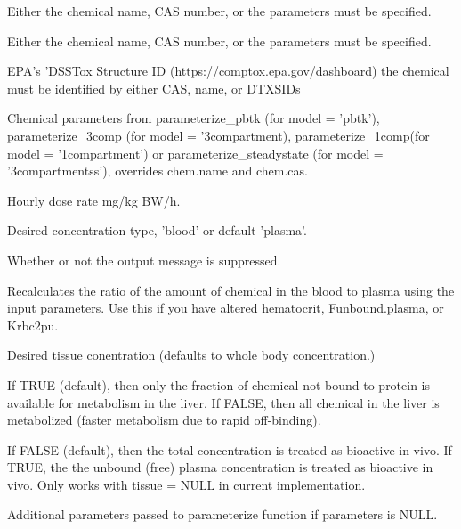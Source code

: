 \documentclass[a4paper]{book}
\begin{document}
%
\begin{Arguments}
\begin{ldescription}
\item[\code{chem.name}] Either the chemical name, CAS number, or the parameters must 
be specified.

\item[\code{chem.cas}] Either the chemical name, CAS number, or the parameters must 
be specified.

\item[\code{dtxsid}] EPA's 'DSSTox Structure ID (\url{https://comptox.epa.gov/dashboard})
the chemical must be identified by either CAS, name, or DTXSIDs

\item[\code{parameters}] Chemical parameters from parameterize\_pbtk (for model = 
'pbtk'), parameterize\_3comp (for model = '3compartment), 
parameterize\_1comp(for model = '1compartment') or parameterize\_steadystate 
(for model = '3compartmentss'), overrides chem.name and chem.cas.

\item[\code{hourly.dose}] Hourly dose rate mg/kg BW/h.

\item[\code{concentration}] Desired concentration type, 'blood' or default 'plasma'.

\item[\code{suppress.messages}] Whether or not the output message is suppressed.

\item[\code{recalc.blood2plasma}] Recalculates the ratio of the amount of chemical 
in the blood to plasma using the input parameters. Use this if you have 
altered hematocrit, Funbound.plasma, or Krbc2pu.

\item[\code{tissue}] Desired tissue conentration (defaults to whole body 
concentration.)

\item[\code{restrictive.clearance}] If TRUE (default), then only the fraction of
chemical not bound to protein is available for metabolism in the liver. If 
FALSE, then all chemical in the liver is metabolized (faster metabolism due
to rapid off-binding).

\item[\code{bioactive.free.invivo}] If FALSE (default), then the total concentration is treated
as bioactive in vivo. If TRUE, the the unbound (free) plasma concentration is treated as 
bioactive in vivo. Only works with tissue = NULL in current implementation.

\item[\code{...}] Additional parameters passed to parameterize function if 
parameters is NULL.
\end{ldescription}
\end{Arguments}
\end{document}
